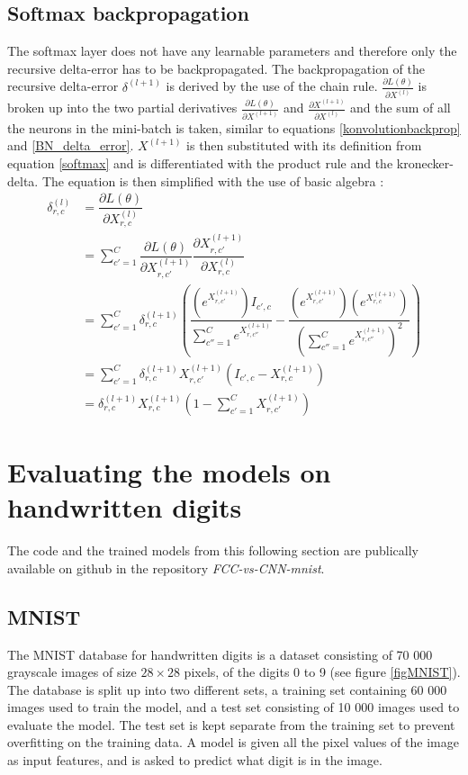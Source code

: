 \documentclass[a4paper, twoside]{article}
\newcommand*{\pd}[2]{\ensuremath{\dfrac{\partial #1}{\partial #2}}}
\newcommand*{\inpd}[2]{\ensuremath{\frac{\partial #1}{\partial #2}}}
\begin{document}
\subsection{Softmax backpropagation}
The softmax layer does not have any learnable parameters and therefore only the recursive delta-error has to be backpropagated. The backpropagation of the recursive delta-error $\delta^{(l+1)}$ is derived by the use of the chain rule. $\inpd{L(\theta)}{X^{(l)}}$ is broken up into the two partial derivatives $\inpd{L(\theta)}{X^{(l+1)}}$ and $\inpd{X^{(l+1)}}{X^{(l)}}$ and the sum of all the neurons in the mini-batch is taken, similar to equations \eqref{konvolutionbackprop} and \eqref{BN_delta_error}. $X^{(l+1)}$ is then substituted with its definition from equation \eqref{softmax} and is differentiated with the product rule and the kronecker-delta. The equation is then simplified with the use of basic algebra \cite{cs231n} \cite{notesonbackprop} \cite{websoftmax}: 
\begin{equation}
\begin{split}
\delta^{(l)}_{r,c}
		& = \pd{L(\theta)}{X^{(l)}_{r,c}} \\
		& = \sum^{C }_{c'=1} \pd{L(\theta)}{X^{(l+1)}_{r,c'}} \pd{X^{(l+1)}_{r,c'}}{X^{(l)}_{r,c}} \\
		& = \sum^{C }_{c'=1} \delta^{(l+1)}_{r,c} \left(  \dfrac{(e^{X^{(l+1)}_{r,c'}})I_{c',c}}{\sum^{C }_{c''=1}e^{X^{(l+1)}_{r,c''}}} - \dfrac{(e^{X^{(l+1)}_{r,c'}})(e^{X^{(l+1)}_{r,c}})}{(\sum^{C }_{c''=1}e^{X^{(l+1)}_{r,c''}})^2} \right) \\
		& = \sum^{C }_{c'=1}  \delta^{(l+1)}_{r,c} X^{(l+1)}_{r,c'}(I_{c',c}-X^{(l+1)}_{r,c}) \\
		& = \delta^{(l+1)}_{r,c} X^{(l+1)}_{r,c} \left( 1-\sum^{C }_{c'=1} X^{(l+1)}_{r,c'} \right)
\end{split}
\end{equation}

\section{Evaluating the models on handwritten digits}
The code and the trained models from this following section are publically available on github in the repository \textit{FCC-vs-CNN-mnist}.

\subsection{MNIST}
The MNIST database for handwritten digits \cite{MNIST} is a dataset consisting of 70 000 grayscale images of size $28 \times 28$ pixels, of the digits 0 to 9 (see figure \ref{figMNIST}). The database is split up into two different sets, a training set containing 60 000 images used to train the model, and a test set consisting of 10 000 images used to evaluate the model. The test set is kept separate from the training set to prevent overfitting on the training data. A model is given all the pixel values of the image as input features, and is asked to predict what digit is in the image.
\end{document}
